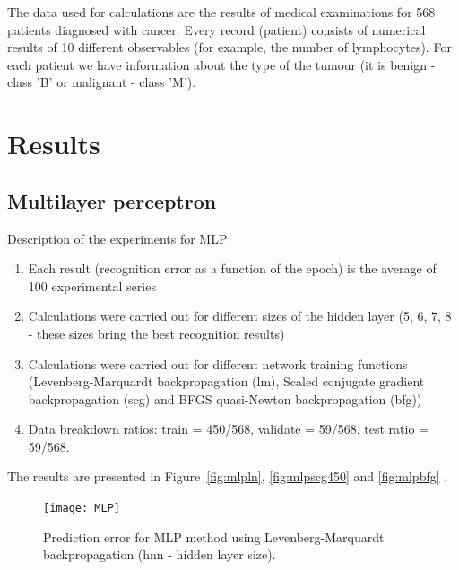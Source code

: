 \documentclass[
10pt, %
a4paper, %
oneside, %
headinclude,footinclude, %
BCOR5mm, %
]{scrartcl}
\begin{document}
The data used for calculations are the results of medical examinations for 568 patients diagnosed with cancer. Every record (patient) consists of numerical results of 10 different observables (for example, the number of lymphocytes). For each patient we have information about the type of the tumour (it is benign - class 'B' or malignant - class 'M'). 
 


\section{Results}

\subsection{Multilayer perceptron}

Description of the experiments for MLP:
\begin{enumerate}[noitemsep] %
\item Each result (recognition error as a function of the epoch) is the average of 100 experimental series
\item Calculations were carried out for different sizes of the hidden layer (5, 6, 7, 8 - these sizes bring the best recognition results)
\item Calculations were carried out for different network training functions (Levenberg-Marquardt backpropagation (lm), Scaled conjugate gradient backpropagation (scg) and BFGS quasi-Newton backpropagation (bfg))
\item Data breakdown ratios: train = 450/568, validate = 59/568, test ratio = 59/568.
\end{enumerate}
The results are presented in Figure~\vref{fig:mlpln}, \vref{fig:mlpscg450} and \vref{fig:mlpbfg} .

\begin{figure}[H]
\centering 
\texttt{[image: MLP]} 
\caption[An example of a floating figure]{Prediction error for MLP method using Levenberg-Marquardt backpropagation (hnn - hidden layer size).} %
\label{fig:mlpln} 
\end{figure}
\end{document}
